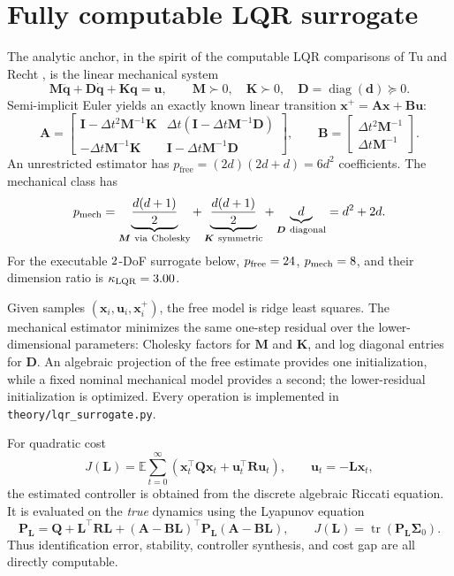 \documentclass[11pt]{article}
\newcommand{\q}{\bm{q}}
\newcommand{\qd}{\dot{\bm{q}}}
\newcommand{\qdd}{\ddot{\bm{q}}}
\newcommand{\M}{\bm{M}}
\newcommand{\E}{\mathbb{E}}
\begin{document}
\section{Fully computable LQR surrogate}
\label{sec:lqr}
The analytic anchor, in the spirit of the computable LQR comparisons of
Tu and Recht \cite{tu2019lqr}, is the linear mechanical system
\begin{equation}
  \M\qdd+\bm{D}\qd+\bm{K}\q=\bm{u},
  \qquad \M\succ0,\quad \bm{K}\succ0,\quad
  \bm{D}=\operatorname{diag}(\bm d)\succeq0.
  \label{eq:linear-mechanics}
\end{equation}
Semi-implicit Euler yields an exactly known linear transition
$\bm{x}^+=\bm{A}\bm{x}+\bm{B}\bm{u}$:
\[
\bm A=
\begin{bmatrix}
\bm I-\Delta t^2\M^{-1}\bm K &
\Delta t(\bm I-\Delta t\M^{-1}\bm D)\\
-\Delta t\M^{-1}\bm K & \bm I-\Delta t\M^{-1}\bm D
\end{bmatrix},
\qquad
\bm B=
\begin{bmatrix}\Delta t^2\M^{-1}\\ \Delta t\M^{-1}\end{bmatrix}.
\]
An unrestricted estimator has
$p_{\mathrm{free}}=(2d)(2d+d)=6d^2$ coefficients. The mechanical class has
\[
  p_{\mathrm{mech}}
  =\underbrace{\frac{d(d+1)}2}_{\M\ {\rm via\ Cholesky}}
   +\underbrace{\frac{d(d+1)}2}_{\bm K\ {\rm symmetric}}
   +\underbrace{d}_{\bm D\ {\rm diagonal}}
  =d^2+2d.
\]
For the executable $2$-DoF surrogate below,
$p_{\mathrm{free}}=24$,
$p_{\mathrm{mech}}=8$, and their dimension ratio is
$\kappa_{\mathrm{LQR}}=3.00$.

Given samples $(\bm{x}_i,\bm{u}_i,\bm{x}_i^+)$, the free model is ridge least
squares. The mechanical estimator minimizes the same one-step residual over
the lower-dimensional parameters: Cholesky factors for $\M$ and $\bm K$, and
log diagonal entries for $\bm D$. An algebraic projection of the free estimate
provides one initialization, while a fixed nominal mechanical model provides
a second; the lower-residual initialization is optimized. Every operation is
implemented in \texttt{theory/lqr\_surrogate.py}.

For quadratic cost
\[
  J(\bm L)=\E\sum_{t=0}^{\infty}
  \left(\bm{x}_t^\top\bm Q\bm{x}_t+
  \bm{u}_t^\top\bm R\bm{u}_t\right),\qquad \bm{u}_t=-\bm L\bm{x}_t,
\]
the estimated controller is obtained from the discrete algebraic Riccati
equation. It is evaluated on the \emph{true} dynamics using the Lyapunov
equation
\[
  \bm P_{\bm L}=\bm Q+\bm L^\top\bm R\bm L+
  (\bm A-\bm B\bm L)^\top\bm P_{\bm L}(\bm A-\bm B\bm L),
  \qquad J(\bm L)=\operatorname{tr}(\bm P_{\bm L}\bm\Sigma_0).
\]
Thus identification error, stability, controller synthesis, and cost gap are
all directly computable.
\end{document}
